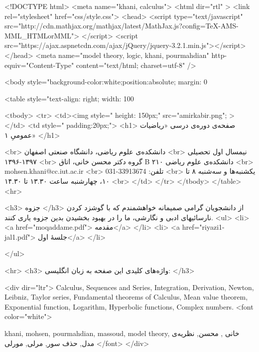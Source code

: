 <!DOCTYPE html>
<meta name="khani, calculus">	 
<html dir="rtl" >
<link rel="stylesheet" href="css/style.css">
<head>
 <script type="text/javascript"
     src="http://cdn.mathjax.org/mathjax/latest/MathJax.js?config=TeX-AMS-MML_HTMLorMML">
  </script>
<script src="https://ajax.aspnetcdn.com/ajax/jQuery/jquery-3.2.1.min.js"></script>
</head>
 <meta name="model theory, logic, khani, pourmahdian" http-equiv="Content-Type" content="text/html; charset=utf-8" />

<body style="background-color:white;position:absolute; margin: 0%

<table style="text-align: right;  width: 100%

<tbody>
    <tr>
      <td><img style=" height: 150px;" src="amirkabir.png"; >
      </td>
      <td  style=" padding:20px;">
<h1>
صفحه‌ی دوره‌ی درسی «ریاضیات عمومیِ ۱»
</h1>

<br>
دانشکده‌ی علوم ریاضی،‌ دانشگاه صنعتی اصفهان
<br>
 نیمسال اول تحصیلی ۱۳۹۷-۱۳۹۶
 <br>
 گروه دکتر محسن خانی، اتاق  B ۲۱۰ دانشکده‌ی علوم ریاضی
 <br>
mohsen.khani@cc.iut.ac.ir
 <br>
 تلفن: 33913674-031
 <br>
 یکشنبه‌ها و سه‌شنبه ۸ تا ۱۰، چهارشنبه ساعت ۱۳.۳۰ تا ۱۴.۳۰
<br>
</td>
 </tr>
      </tbody>
</table>
<hr>

	<h3>
جزوه
</h3>
از دانشجویان گرامی صمیمانه خواهشمندم که با گوشزد کردن نارسائیهای ادبی و نگارشی،  ما را در بهبود بخشیدن بدین جزوه یاری کنند.
<ul>
<li>
<a href="moqaddame.pdf"> مقدمه</a>
</li>
<li>
<a href="riyazi1-jal1.pdf"> جلسهٔ اول</a>
</li>

</ul>

<hr>
<h3>
واژه‌های کلیدی این صفحه به زبان انگلیسی:
</h3>

<div dir="ltr">
Calculus, Sequences and Series, Integration, Derivation, Newton, Leibniz, Taylor series,  Fundamental theorems of Calculus, Mean value theorem,
Exponential function, Logarithm, Hyperbolic functions, Complex numbers.
 <font color="white">
 
khani, mohsen, pourmahdian, massoud, model theory, خانی , محسن, نظریه‌ی مدل, حذف سور, مرلی, مورلی
</font>
</div>
